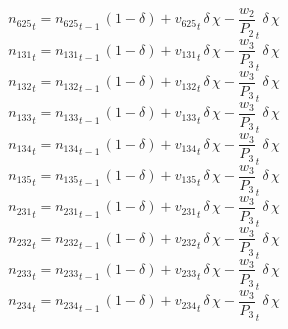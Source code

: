 \begin{dmath}
{{n_{625}}}_{t}={{n_{625}}}_{t-1}\, \left(1-{{\delta}}\right)+{{v_{625}}}_{t}\, {{\delta}}\, {{\chi}}-{{\frac{w_{2}}{P_{2}}}}_{t}\, {{\delta}}\, {{\chi}}
\end{dmath}
\begin{dmath}
{{n_{131}}}_{t}={{n_{131}}}_{t-1}\, \left(1-{{\delta}}\right)+{{v_{131}}}_{t}\, {{\delta}}\, {{\chi}}-{{\frac{w_{3}}{P_{3}}}}_{t}\, {{\delta}}\, {{\chi}}
\end{dmath}
\begin{dmath}
{{n_{132}}}_{t}={{n_{132}}}_{t-1}\, \left(1-{{\delta}}\right)+{{v_{132}}}_{t}\, {{\delta}}\, {{\chi}}-{{\frac{w_{3}}{P_{3}}}}_{t}\, {{\delta}}\, {{\chi}}
\end{dmath}
\begin{dmath}
{{n_{133}}}_{t}={{n_{133}}}_{t-1}\, \left(1-{{\delta}}\right)+{{v_{133}}}_{t}\, {{\delta}}\, {{\chi}}-{{\frac{w_{3}}{P_{3}}}}_{t}\, {{\delta}}\, {{\chi}}
\end{dmath}
\begin{dmath}
{{n_{134}}}_{t}={{n_{134}}}_{t-1}\, \left(1-{{\delta}}\right)+{{v_{134}}}_{t}\, {{\delta}}\, {{\chi}}-{{\frac{w_{3}}{P_{3}}}}_{t}\, {{\delta}}\, {{\chi}}
\end{dmath}
\begin{dmath}
{{n_{135}}}_{t}={{n_{135}}}_{t-1}\, \left(1-{{\delta}}\right)+{{v_{135}}}_{t}\, {{\delta}}\, {{\chi}}-{{\frac{w_{3}}{P_{3}}}}_{t}\, {{\delta}}\, {{\chi}}
\end{dmath}
\begin{dmath}
{{n_{231}}}_{t}={{n_{231}}}_{t-1}\, \left(1-{{\delta}}\right)+{{v_{231}}}_{t}\, {{\delta}}\, {{\chi}}-{{\frac{w_{3}}{P_{3}}}}_{t}\, {{\delta}}\, {{\chi}}
\end{dmath}
\begin{dmath}
{{n_{232}}}_{t}={{n_{232}}}_{t-1}\, \left(1-{{\delta}}\right)+{{v_{232}}}_{t}\, {{\delta}}\, {{\chi}}-{{\frac{w_{3}}{P_{3}}}}_{t}\, {{\delta}}\, {{\chi}}
\end{dmath}
\begin{dmath}
{{n_{233}}}_{t}={{n_{233}}}_{t-1}\, \left(1-{{\delta}}\right)+{{v_{233}}}_{t}\, {{\delta}}\, {{\chi}}-{{\frac{w_{3}}{P_{3}}}}_{t}\, {{\delta}}\, {{\chi}}
\end{dmath}
\begin{dmath}
{{n_{234}}}_{t}={{n_{234}}}_{t-1}\, \left(1-{{\delta}}\right)+{{v_{234}}}_{t}\, {{\delta}}\, {{\chi}}-{{\frac{w_{3}}{P_{3}}}}_{t}\, {{\delta}}\, {{\chi}}
\end{dmath}
